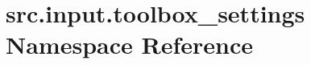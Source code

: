 \hypertarget{namespacesrc_1_1input_1_1toolbox__settings}{\section{src.\+input.\+toolbox\+\_\+settings Namespace Reference}
\label{namespacesrc_1_1input_1_1toolbox__settings}
}
